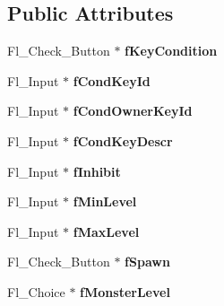 \subsection*{\-Public \-Attributes}
\begin{DoxyCompactItemize}
\item 
\hypertarget{classActivator_aac50c22b416a8aac8c41b1186a47f438}{\-Fl\-\_\-\-Check\-\_\-\-Button $\ast$ {\bfseries f\-Key\-Condition}}\label{classActivator_aac50c22b416a8aac8c41b1186a47f438}

\item 
\hypertarget{classActivator_a4fafad47fbb5428d4f4b195f3e6d7cae}{\-Fl\-\_\-\-Input $\ast$ {\bfseries f\-Cond\-Key\-Id}}\label{classActivator_a4fafad47fbb5428d4f4b195f3e6d7cae}

\item 
\hypertarget{classActivator_afe3765c9c2399ff52f1113eefa579562}{\-Fl\-\_\-\-Input $\ast$ {\bfseries f\-Cond\-Owner\-Key\-Id}}\label{classActivator_afe3765c9c2399ff52f1113eefa579562}

\item 
\hypertarget{classActivator_a03ce6fd199e3fe1d19501fec3cf57722}{\-Fl\-\_\-\-Input $\ast$ {\bfseries f\-Cond\-Key\-Descr}}\label{classActivator_a03ce6fd199e3fe1d19501fec3cf57722}

\item 
\hypertarget{classActivator_a7b3ca92c2192f51782b7b1de2f17d001}{\-Fl\-\_\-\-Input $\ast$ {\bfseries f\-Inhibit}}\label{classActivator_a7b3ca92c2192f51782b7b1de2f17d001}

\item 
\hypertarget{classActivator_a805070b20ac321b298c5e06451f36d8c}{\-Fl\-\_\-\-Input $\ast$ {\bfseries f\-Min\-Level}}\label{classActivator_a805070b20ac321b298c5e06451f36d8c}

\item 
\hypertarget{classActivator_a2f13830fa5197db71fd09e77616ab158}{\-Fl\-\_\-\-Input $\ast$ {\bfseries f\-Max\-Level}}\label{classActivator_a2f13830fa5197db71fd09e77616ab158}

\item 
\hypertarget{classActivator_afa6bb22f072ea8ac59a8b694668e5390}{\-Fl\-\_\-\-Check\-\_\-\-Button $\ast$ {\bfseries f\-Spawn}}\label{classActivator_afa6bb22f072ea8ac59a8b694668e5390}

\item 
\hypertarget{classActivator_a638e3ca9d8331ec38e645e59480b09e9}{\-Fl\-\_\-\-Choice $\ast$ {\bfseries f\-Monster\-Level}}\label{classActivator_a638e3ca9d8331ec38e645e59480b09e9}


\end{DoxyCompactItemize}
